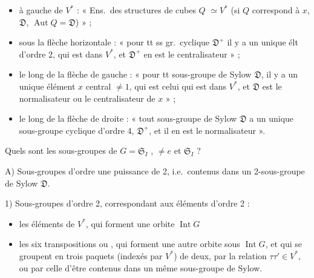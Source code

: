 \documentclass[11pt,a4paper]{article}
\begin{document}

\begin{itemize}
  \item[] à gauche de $V^{*}$ : « Ens.\ des structures de cubes $Q$
    $\simeq V^{*}$ (si $Q$ correspond à $x$, \ill{} \ill{} $\mathfrak{D}$,
    \ill{} $\operatorname{Aut} Q = \mathfrak{D}$) » ;
  \item[] sous la flèche horizontale : « pour tt ss gr.\ cyclique
    $\mathfrak{D}^+$ il y a un unique élt d'ordre 2, qui est dans $V^{*}$, et
    $\mathfrak{D}^+$ en est le centralisateur » ;
  \item[] le long de la flèche de gauche : « pour tt sous-groupe de Sylow
    $\mathfrak{D}$, il y a un unique élément $x$ central $\neq 1$, qui est
    celui qui est dans $V^{*}$, et $\mathfrak{D}$ est le normalisateur ou le
    centralisateur de $x$ » ;
  \item[] le long de la flèche de droite : « tout sous-groupe de Sylow
    $\mathfrak{D}$ a un unique sous-groupe cyclique d'ordre 4,
    $\mathfrak{D}^+$, et il en est le normalisateur ».
\end{itemize}

Quels sont les sous-groupes de $G = \mathfrak{S}_I$ \struck{\ill{}},
$\neq e$ et $\mathfrak{S}_I$ ?

A) Sous-groupes d'ordre une puissance de 2, i.e.\ contenus dans un
2-sous-groupe de Sylow $\mathfrak{D}$.


1) Sous-groupes d'ordre 2, correspondant aux éléments d'ordre 2 :
\begin{itemize}
  \item[a)] les  éléments de $V^{*}$, qui forment une orbite
     $\operatorname{Int} G$
  \item[b)] les six transpositions ou , qui forment une
    autre orbite sous $\operatorname{Int} G$, et qui se groupent en trois
    paquets (indexés par $V^{*}$) de deux, par la relation
    $\tau\tau' \in V^{*}$, ou par celle d'être contenus dans un même
    sous-groupe de Sylow. 
\end{itemize}
\end{document}
